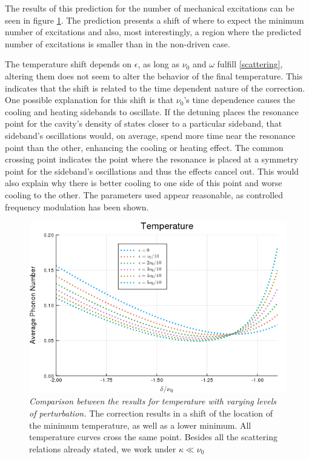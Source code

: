 \documentclass[reprint, amsmath,amssymb, aps,pra]{revtex4-1}
\begin{document}
The results of this prediction for the number of mechanical
excitations can be seen in figure \ref{GraficaTemp}. The prediction
presents a shift of where to expect the minimum number of excitations
and also, most interestingly, a region where the predicted number of
excitations is smaller than in the non-driven case.

The temperature shift depends on $\epsilon$, as long as $\nu_0$ and $\omega$ fulfill \eqref{scattering}, altering them does not seem to alter the behavior of the final temperature. This indicates that the shift is related to the time dependent nature of the correction. One possible explanation for this shift is that $\nu_0$'s time dependence causes the cooling and heating sidebands to oscillate. If the detuning places the resonance point for the cavity's density of states closer to a particular sideband, that sideband's oscillations would, on average, spend more time near the resonance point than the other, enhancing the cooling or heating effect.  The common crossing point indicates the point where the resonance is placed at a symmetry point for the sideband's oscillations and thus the effects cancel out. This would also explain why there is better cooling to one side of this point and worse cooling to the other. The parameters used appear reasonable, as controlled frequency modulation has been shown\cite{WoolleyNM}\cite{JockelS}.



\begin{figure}
\includegraphics[scale=.4]{Temperature.png}  
\caption{\textit{Comparison between the results for temperature with
    varying levels of perturbation.} The correction results in a
  shift of the location of the minimum temperature, as well as a lower
  minimum. All temperature curves cross the same point. Besides all the scattering relations already stated, we
  work under $\kappa \ll \nu_0$}
\label{GraficaTemp}
\end{figure}
\end{document}
